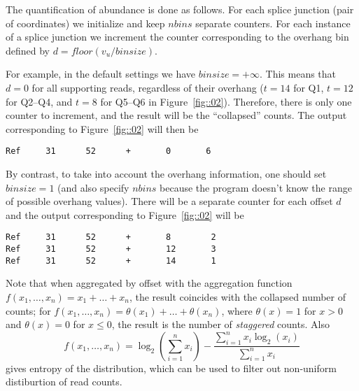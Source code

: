 \documentclass{article}
\begin{document}
The quantification of abundance is done as follows. For each splice junction (pair of coordinates) 
we initialize and keep $nbins$ separate counters. For each instance of a splice junction we increment 
the counter corresponding to the overhang bin defined by $d=floor(v_u/binsize)$.

For example, in the default settings we have $binsize=+\infty$. This means that $d=0$ for all supporting 
reads, regardless of their overhang ($t=14$ for Q1, $t=12$ for Q2--Q4, and $t=8$ for Q5--Q6 in 
Figure~\ref{fig::02}). Therefore, there is only one counter to increment, and the result will be the 
``collapsed'' counts. The output corresponding to Figure~\ref{fig::02} will then be
\begin{verbatim}
Ref     31      52      +       0       6
\end{verbatim}

By contrast, to take into account the overhang information, one should set $binsize=1$ (and also specify $nbins$ 
because the program doesn't know the range of possible overhang values). There will be a separate counter for each 
offset $d$ and the output corresponding to Figure~\ref{fig::02} will be
\begin{verbatim}
Ref     31      52      +       8        2
Ref     31      52      +       12       3
Ref     31      52      +       14       1
\end{verbatim}
Note that when aggregated by offset with the aggregation function $f(x_1,\dots,x_n) = x_1+\dots+x_n$, the result
coincides with the collapsed number of counts; for $f(x_1,\dots,x_n) = \theta(x_1)+\dots+\theta(x_n)$, where 
$\theta(x)=1$ for $x>0$ and $\theta(x)=0$ for $x\le0$, the result is the number of {\em staggered} counts.
Also $$f(x_1,\dots,x_n) = \log_2(\sum\limits_{i=1}^nx_i) - \frac{\sum\limits_{i=1}^nx_i\log_2(x_i)}{\sum\limits_{i=1}^nx_i}$$
gives entropy of the distribution, which can be used to filter out non-uniform distiburtion of read counts.



\end{document}
